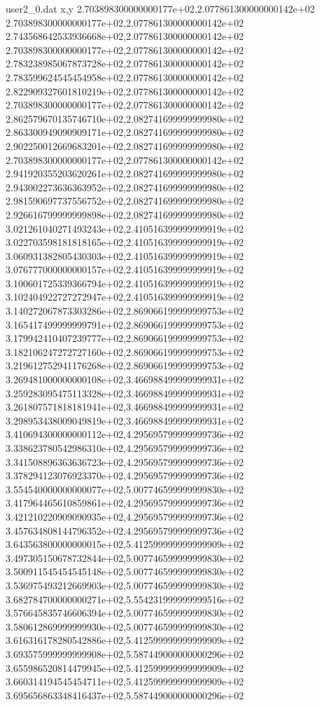 \begin{filecontents}{user2_0.dat}
x,y
2.703898300000000177e+02,2.077861300000000142e+02
2.703898300000000177e+02,2.077861300000000142e+02
2.743568642533936668e+02,2.077861300000000142e+02
2.703898300000000177e+02,2.077861300000000142e+02
2.783238985067873728e+02,2.077861300000000142e+02
2.783599624545454958e+02,2.077861300000000142e+02
2.822909327601810219e+02,2.077861300000000142e+02
2.703898300000000177e+02,2.077861300000000142e+02
2.862579670135746710e+02,2.082741699999999980e+02
2.863300949090909171e+02,2.082741699999999980e+02
2.902250012669683201e+02,2.082741699999999980e+02
2.703898300000000177e+02,2.077861300000000142e+02
2.941920355203620261e+02,2.082741699999999980e+02
2.943002273636363952e+02,2.082741699999999980e+02
2.981590697737556752e+02,2.082741699999999980e+02
2.926616799999999898e+02,2.082741699999999980e+02
3.021261040271493243e+02,2.410516399999999919e+02
3.022703598181818165e+02,2.410516399999999919e+02
3.060931382805430303e+02,2.410516399999999919e+02
3.076777000000000157e+02,2.410516399999999919e+02
3.100601725339366794e+02,2.410516399999999919e+02
3.102404922727272947e+02,2.410516399999999919e+02
3.140272067873303286e+02,2.869066199999999753e+02
3.165417499999999791e+02,2.869066199999999753e+02
3.179942410407239777e+02,2.869066199999999753e+02
3.182106247272727160e+02,2.869066199999999753e+02
3.219612752941176268e+02,2.869066199999999753e+02
3.269481000000000108e+02,3.466988499999999931e+02
3.259283095475113328e+02,3.466988499999999931e+02
3.261807571818181941e+02,3.466988499999999931e+02
3.298953438009049819e+02,3.466988499999999931e+02
3.410694300000000112e+02,4.295695799999999736e+02
3.338623780542986310e+02,4.295695799999999736e+02
3.341508896363636723e+02,4.295695799999999736e+02
3.378294123076923370e+02,4.295695799999999736e+02
3.554540000000000077e+02,5.007746599999999830e+02
3.417964465610859861e+02,4.295695799999999736e+02
3.421210220909090935e+02,4.295695799999999736e+02
3.457634808144796352e+02,4.295695799999999736e+02
3.643563800000000015e+02,5.412599999999999909e+02
3.497305150678732844e+02,5.007746599999999830e+02
3.500911545454545148e+02,5.007746599999999830e+02
3.536975493212669903e+02,5.007746599999999830e+02
3.682784700000000271e+02,5.554231999999999516e+02
3.576645835746606394e+02,5.007746599999999830e+02
3.580612869999999930e+02,5.007746599999999830e+02
3.616316178280542886e+02,5.412599999999999909e+02
3.693575999999999908e+02,5.587449000000000296e+02
3.655986520814479945e+02,5.412599999999999909e+02
3.660314194545454711e+02,5.412599999999999909e+02
3.695656863348416437e+02,5.587449000000000296e+02

\end{filecontents}
